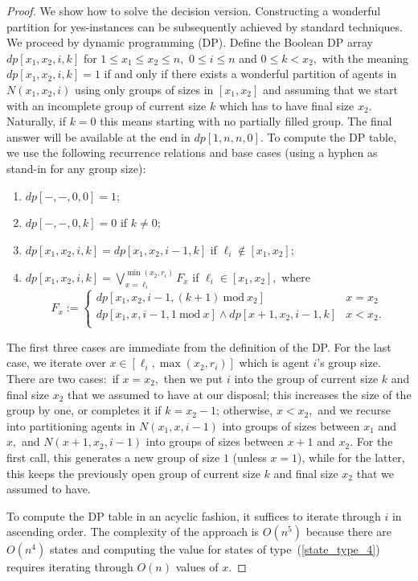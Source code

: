 \documentclass[a4paper,UKenglish,cleveref, autoref, thm-restate]{lipics-v2021}
\newcommand{\Mod}[1]{\ \mathrm{mod}\ #1}
\begin{document}
\begin{proof} We show how to solve the decision version. Constructing a wonderful partition for yes-instances can be subsequently achieved by standard techniques. We proceed by dynamic programming (DP). Define the Boolean DP array $\mathit{dp}[x_1, x_2, i, k]$ for $1 \leq x_1 \leq x_2 \leq n,$ $0 \leq i \leq n$ and $0 \leq k < x_2,$ with the meaning $\mathit{dp}[x_1, x_2, i, k] = 1$ if and only if there exists a wonderful partition of agents in $N(x_1, x_2, i)$ using only groups of sizes in $[x_1, x_2]$ and assuming that we start with an incomplete group of current size $k$ which has to have final size $x_2.$ Naturally, if $k = 0$ this means starting with no partially filled group. The final answer will be available at the end in $\mathit{dp}[1, n, n, 0].$ To compute the DP table, we use the following recurrence relations and base cases (using a hyphen as stand-in for any group size):

\begin{enumerate}
    \itemsep0em 
    \item $\mathit{dp}[-, -, 0, 0] = 1$;
    \item $\mathit{dp}[-, -, 0, k] = 0$ if $k \neq 0$;
    \item $\mathit{dp}[x_1, x_2, i, k] = \mathit{dp}[x_1, x_2, i - 1, k]$ if $\ell_i \notin [x_1, x_2]$;
    \item \label{state_type_4} $\mathit{dp}[x_1, x_2, i, k] = \bigvee_{x = \ell_i}^{\min(x_2, r_i)}F_x$ if $\ell_i \in [x_1, x_2],$ where 
    \[ 
F_x := \left\{
\begin{array}{ll}
      \mathit{dp}[x_1, x_2, i - 1, (k + 1) \Mod{x_2}] & x = x_2 \\
      \mathit{dp}[x_1, x, i - 1, 1 \Mod{x}] \land \mathit{dp}[x + 1, x_2, i - 1, k] & x < x_2. \\
\end{array} 
\right. 
\]
\end{enumerate}
The first three cases are immediate from the definition of the DP. For the last case, we iterate over $x \in [\ell_i, \max(x_2, r_i)]$ which is agent $i$'s group size. There are two cases:~if $x = x_2,$ then we put $i$ into the group of current size $k$ and final size $x_2$ that we assumed to have at our disposal; this increases the size of the group by one, or completes it if $k = x_2 - 1$; otherwise, $x < x_2,$ and we recurse into partitioning agents in $N(x_1, x, i - 1)$ into groups of sizes between $x_1$ and $x,$ and $N(x + 1, x_2, i - 1)$ into groups of sizes between $x + 1$ and $x_2.$ For the first call, this generates a new group of size $1$ (unless $x = 1$), while for the latter, this keeps the previously open group of current size $k$ and final size $x_2$ that we assumed to have.

To compute the DP table in an acyclic fashion, it suffices to iterate through $i$ in ascending order. The complexity of the approach is $O(n^5)$ because there are $O(n^4)$ states and computing the value for states of type~(\ref{state_type_4}) requires iterating through $O(n)$ values of $x.$
\end{proof}
\end{document}
